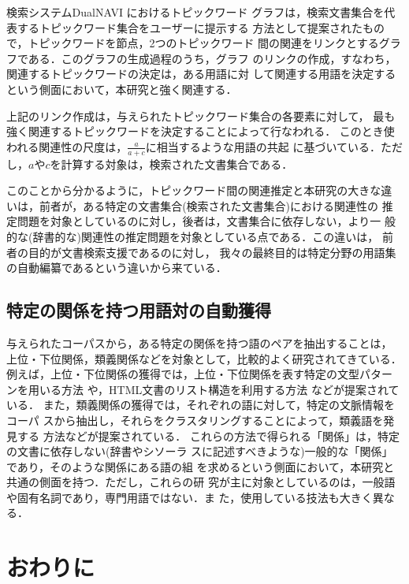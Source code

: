 検索システムDualNAVI におけるトピックワード
グラフは，検索文書集合を代表するトピックワード集合をユーザーに提示する
方法として提案されたもので，トピックワードを節点，2つのトピックワード
間の関連をリンクとするグラフである．このグラフの生成過程のうち，グラフ
のリンクの作成，すなわち，関連するトピックワードの決定は，ある用語に対
して関連する用語を決定するという側面において，本研究と強く関連する．

上記のリンク作成は，与えられたトピックワード集合の各要素に対して，
最も強く関連するトピックワードを決定することによって行なわれる．
このとき使われる関連性の尺度は，$\frac{a}{a+c}$に相当するような用語の共起
に基づいている．ただし，$a$や$c$を計算する対象は，検索された文書集合である．

このことから分かるように，トピックワード間の関連推定と本研究の大きな違
いは，前者が，ある特定の文書集合(検索された文書集合)における関連性の
推定問題を対象としているのに対し，後者は，文書集合に依存しない，より一
般的な(辞書的な)関連性の推定問題を対象としている点である．この違いは，
前者の目的が文書検索支援であるのに対し，
我々の最終目的は特定分野の用語集の自動編纂であるという違いから来ている．


\subsection{特定の関係を持つ用語対の自動獲得}

与えられたコーパスから，ある特定の関係を持つ語のペアを抽出することは，
上位・下位関係，類義関係などを対象として，比較的よく研究されてきている．
例えば，上位・下位関係の獲得では，上位・下位関係を表す特定の文型パター
ンを用いる方法
\cite{hearst92acquisition_hyponyms}や，HTML文書のリスト構造を利用する方法
\cite{shinzato05html}などが提案されている．
また，類義関係の獲得では，それぞれの語に対して，特定の文脈情報をコーパ
スから抽出し，それらをクラスタリングすることによって，類義語を発見する
方法などが提案されている\cite{hindle90noun_classification,lin98automatic_retrieval}．
これらの方法で得られる「関係」は，特定の文書に依存しない(辞書やシソーラ
スに記述すべきような)一般的な「関係」であり，そのような関係にある語の組
を求めるという側面において，本研究と共通の側面を持つ．ただし，これらの研
究が主に対象としているのは，一般語や固有名詞であり，専門用語ではない．ま
た，使用している技法も大きく異なる．


\section{おわりに} \label{chap6}

